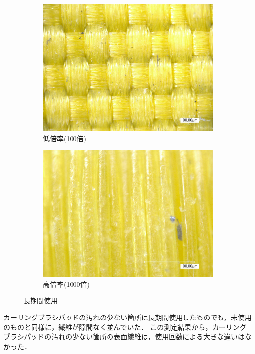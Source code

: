 \documentclass[main]{subfiles}
\begin{document}
\begin{figure}[H]
    \centering
    \begin{subfigure}[htbp]{0.45\linewidth}
        \centering
        \includegraphics[keepaspectratio, width=0.8\linewidth]{figures/中心/カーリングパッド長期低倍率.jpg}
        \caption{低倍率(100倍)}
        \label{fig:label}
    \end{subfigure}
    \begin{subfigure}[htbp]{0.45\linewidth}
        \centering
        \includegraphics[keepaspectratio, width=0.8\linewidth]{figures/中心/カーリングパッド長期.jpg}
        \caption{高倍率(1000倍)}
        \label{fig:label}
    \end{subfigure}
    \caption{長期間使用}
    \label{fig:7}
\end{figure}


カーリングブラシパッドの汚れの少ない箇所は長期間使用したものでも，未使用のものと同様に，繊維が隙間なく並んでいた．
この測定結果から，カーリングブラシパッドの汚れの少ない箇所の表面繊維は，使用回数による大きな違いはなかった．
\end{document}
